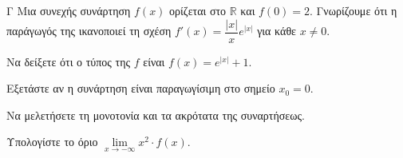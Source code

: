 \begin{thema}{Γ}
Μια συνεχής συνάρτηση $f(x)$ ορίζεται στο $\mathbb{R}$ και $f(0)=2$. Γνωρίζουμε ότι η παράγωγός της ικανοποιεί τη σχέση $f'(x) = \dfrac{|x|}{x} e^{|x|}$ για κάθε $x \ne 0$.
\begin{erwthma}
  \item Να δείξετε ότι ο τύπος της $f$ είναι $f(x)=e^{|x|}+1$.
  \item Εξετάστε αν η συνάρτηση είναι παραγωγίσιμη στο σημείο $x_0=0$.
  \item Να μελετήσετε τη μονοτονία και τα ακρότατα της συναρτήσεως.
  \item Υπολογίστε το όριο $\lim\limits_{x \to -\infty} x^2 \cdot f(x)$.
\end{erwthma}
\end{thema}
